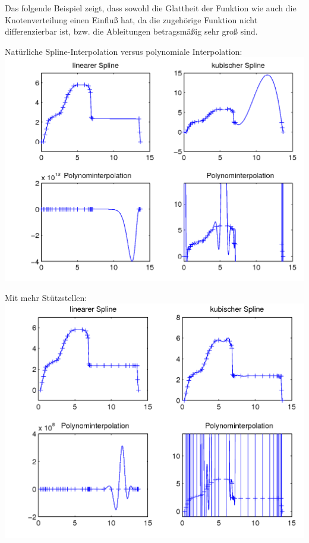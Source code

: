                 \begin{Bspe}[Laster]\label{5.2.20}
                  Das folgende Beispiel zeigt,
                  dass sowohl die Glattheit der Funktion
                  wie auch die Knotenverteilung einen Einfluß hat,
                  da die zugehörige Funktion nicht differenzierbar ist,
                  bzw. die Ableitungen betragsmäßig sehr groß sind.

                  Natürliche Spline-Interpolation
                  versus polynomiale Interpolation:\\
                  {\centering
                    \includegraphics[width=\linewidth]{images/laster1.png}
                  }

                  Mit mehr Stützstellen:\\
                  {\centering
                    \includegraphics[width=\linewidth]{images/laster2.png} 
                  }
                \end{Bspe}

